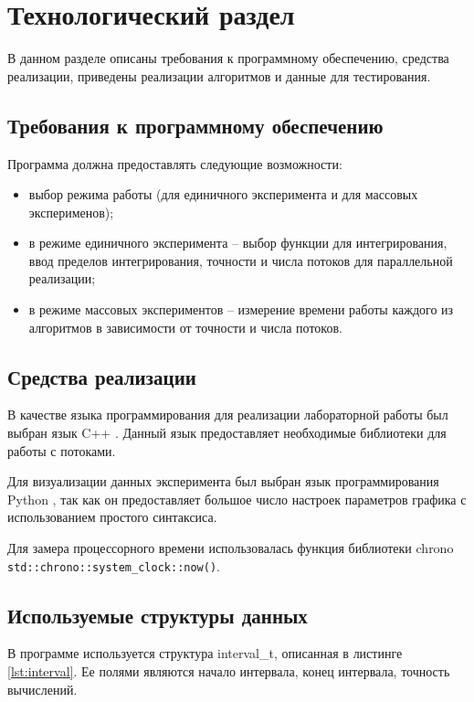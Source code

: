 \section{Технологический раздел \hfill}
\vspace{\baselineskip}

В данном разделе описаны требования к программному обеспечению, средства реализации, приведены реализации алгоритмов и данные для тестирования.

\subsection{Требования к программному обеспечению}

Программа должна предоставлять следующие возможности:
\begin{itemize}[label=---]
    \item выбор режима работы (для единичного эксперимента и для массовых эксперименов);
    \item в режиме единичного эксперимента -- выбор функции для интегрирования, ввод пределов интегрирования, точности и числа потоков для параллельной реализации;
    \item в режиме массовых экспериментов -- измерение времени работы каждого из алгоритмов в зависимости от точности и числа потоков.
\end{itemize}

\subsection{Средства реализации}

В качестве языка программирования для реализации лабораторной работы был выбран язык C++ \cite{cpp}. Данный язык предоставляет необходимые библиотеки для работы с потоками. 

Для визуализации данных эксперимента был выбран язык программирования Python \cite{python}, так как он предоставляет большое число настроек параметров графика с использованием простого синтаксиса. 

Для замера процессорного времени использовалась функция библиотеки chrono \cite{chrono} \texttt{std::chrono::system\_clock::now()}.

\subsection{Используемые структуры данных}

В программе используется структура interval\_t, описанная в листинге \ref{lst:interval}. Ее полями являются начало интервала, конец интервала, точность вычислений.

